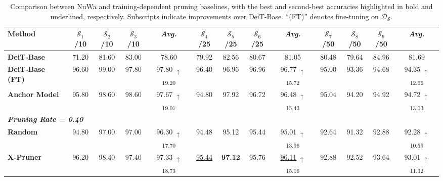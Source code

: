 
\begin{table}[t]
\centering
\caption{Comparison between NuWa and training-dependent pruning baselines, with the best and second-best accuracies highlighted in bold and underlined, respectively. Subscripts indicate improvements over DeiT-Base. “(FT)” denotes fine-tuning on $\mathcal{D_S}$.}
\label{tab:training_dependent_comparison}
\begin{scriptsize}
\renewcommand{\arraystretch}{1.1}
\begin{tabular}{l||ccc|c||ccc|c||ccc|c}
\toprule
\textbf{Method} & $\mathcal{S}_1$/10 & $\mathcal{S}_2$/10 & $\mathcal{S}_3$/10 & \textit{Avg.} & $\mathcal{S}_4$/25 & $\mathcal{S}_5$/25 & $\mathcal{S}_6$/25 & \textit{Avg.} & $\mathcal{S}_7$/50 & $\mathcal{S}_8$/50 & $\mathcal{S}_9$/50 & \textit{Avg.}\\
\hline\hline
\textbf{DeiT-Base} & 71.20 & 81.60 & 83.00 & 78.60 & 79.92 & 82.56 & 80.67 & 81.05 & 80.48 & 79.64 & 84.96 & 81.69\\
\rowcolor[gray]{0.95}
\textbf{DeiT-Base (FT)} & 96.60 & 99.00 & 97.80 & 97.80 \textsubscript{\textcolor{upred}{$\uparrow$19.20}} & 96.40 & 96.96 & 96.96 & 96.77 \textsubscript{\textcolor{upred}{$\uparrow$15.72}} & 95.00 & 93.36 & 94.68 & 94.35 \textsubscript{\textcolor{upred}{$\uparrow$12.66}}\\
\hline\hline\rowcolor[HTML]{FFF2E0}
\textbf{Anchor Model} & 95.80 & 98.60 & 98.60 & 97.67 \textsubscript{\textcolor{upred}{$\uparrow$19.07}} & 94.80 & 97.92 & 96.72 & 96.48 \textsubscript{\textcolor{upred}{$\uparrow$15.43}} & 95.04 & 94.20 & 94.92 & 94.72 \textsubscript{\textcolor{upred}{$\uparrow$13.03}}\\
\hline\hline
\multicolumn{13}{l}{\textit{\textcolor{gray!70}{\textbf{Pruning Rate = 0.40}}}}\\
\textbf{Random} & 94.80 & 97.00 & 97.00 & 96.30 \textsubscript{\textcolor{upred}{$\uparrow$17.70}} & 94.48 & 95.12 & 95.44 & 95.01 \textsubscript{\textcolor{upred}{$\uparrow$13.96}} & 92.64 & 91.32 & 92.88 & 92.28 \textsubscript{\textcolor{upred}{$\uparrow$10.59}}\\
\rowcolor[gray]{0.95}
\textbf{X-Pruner} & 96.20 & 98.40 & 97.40 & 97.33 \textsubscript{\textcolor{upred}{$\uparrow$18.73}} & \underline{95.44} & \textbf{97.12} & 95.76 & \underline{96.11} \textsubscript{\textcolor{upred}{$\uparrow$15.06}} & 92.88 & 92.52 & 93.64 & 93.01 \textsubscript{\textcolor{upred}{$\uparrow$11.32}}\\

\end{tabular}
\end{scriptsize}
\end{table}
